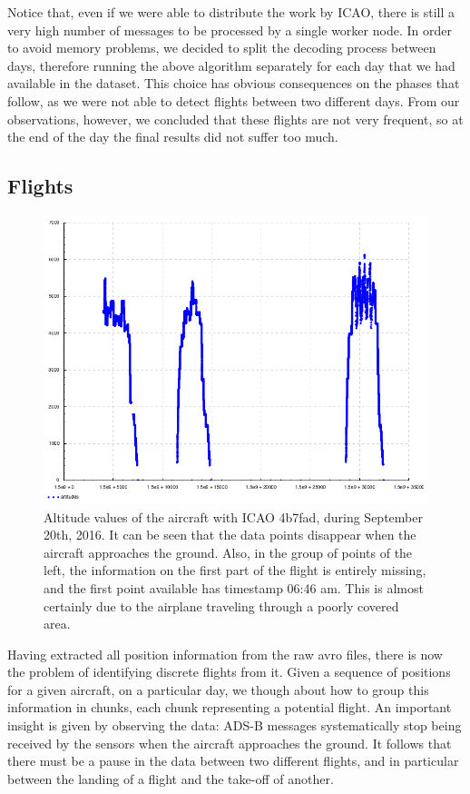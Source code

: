 \documentclass{vldb}
\begin{document}
Notice that, even if we were able to distribute the work by ICAO, there is still
a very high number of messages to be processed by a single worker node. In order
to avoid memory problems, we decided to split the decoding process between days,
therefore running the above algorithm separately for each day that we had
available in the dataset. This choice has obvious consequences on the phases
that follow, as we were not able to detect flights between two different days.
From our observations, however, we concluded that these flights are not very
frequent, so at the end of the day the final results did not suffer too much.

\subsection{Flights}

\begin{figure}[h]
  \centering
  \includegraphics[scale=0.28]{imgs/4b7fad-altitudes.png}
  \caption{Altitude values of the aircraft with ICAO 4b7fad, during September
    20th, 2016. It can be seen that the data points disappear when the aircraft
    approaches the ground. Also, in the group of points of the left, the
    information on the first part of the flight is entirely missing, and the
    first point available has timestamp 06:46 am. This is almost
    certainly due to the airplane traveling through a poorly covered area.}
  \label{fig:alts}
\end{figure}

Having extracted all position information from the raw avro files, there is now
the problem of identifying discrete flights from it.
Given a sequence of positions for a given aircraft, on a particular day, we
though about how to group this information in chunks, each chunk representing a
potential flight. An important insight is given by observing the data: ADS-B
messages systematically stop being received by the sensors when the aircraft
approaches the ground. It follows that there must be a pause in the data between
two different flights, and in particular between the landing of a flight and the
take-off of another.
\end{document}
